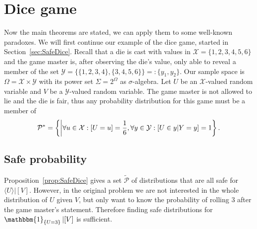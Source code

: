 \documentclass[a4paper]{report}
\theoremstyle{plain}
\theoremstyle{definition}
\theoremstyle{remark}
\numberwithin{equation}{chapter}
\let\P\relax
\DeclareMathOperator{\P}{\mathbb{P}}
\DeclareMathOperator{\1}{\mathbbm{1}}
\newcommand{\X}{\mathcal{X}}
\newcommand{\Y}{\mathcal{Y}}
\newcommand{\Pmod}{\mathcal{P}^*}
\newcommand{\DieInd}{\1_{\{U=3\}}}
\begin{document}
\section{Dice game}\label{sec:DiscDice}
Now the main theorems are stated, we can apply them to some well-known paradoxes. We will first continue our example of the dice game, started in Section~\ref{sec:SafeDice}. Recall that a die is cast with values in $\X=\{1,2,3,4,5,6\}$ and the game master is, after observing the die's value, only able to reveal a member of the set $\Y=\{\{1,2,3,4\},\{3,4,5,6\}\}=:\{y_1,y_2\}$. Our sample space is $\Omega=\X\times\Y$ with its power set $\Sigma=2^\Omega$ as $\sigma$-algebra. Let $U$ be an $\X$-valued random variable and $V$ be a $\Y$-valued random variable. The game master is not allowed to lie and the die is fair, thus any probability distribution for this game must be a member of \begin{equation}
\Pmod=\left\{\P\middle|\forall u\in\X:\P[U=u]=\frac{1}{6},\forall y\in\Y:\P[U\in y|Y=y]=1\right\}.
\end{equation}

\subsection{Safe probability}
Proposition~\ref{prop:SafeDice} gives a set $\tilde{\mathcal{P}}$ of distributions that are all safe for $\langle U\rangle|[V]$. However, in the original problem we are not interested in the whole distribution of $U$ given $V$, but only want to know the probability of rolling $3$ after the game master's statement. Therefore finding safe distributions for $\DieInd|[V]$ is sufficient.
\end{document}
